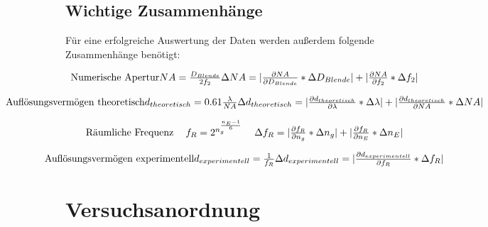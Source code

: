 \documentclass[12pt,a4paper,twoside]{article}
\begin{document}
\subsection{Wichtige Zusammenhänge}

Für eine erfolgreiche Auswertung der Daten werden außerdem folgende Zusammenhänge benötigt:

\begin{equation}
    \label{eq:WZ-NA}
    \centerline{Numerische Apertur \\ $NA = \frac{D_{Blende}}{2f_{2}}$ \\ $\Delta NA = \vert \frac{\partial NA}{\partial D_{Blende}} * \Delta D_{Blende} \vert + \vert \frac{\partial NA}{\partial f_{2}} * \Delta f_{2} \vert $}
\end{equation}

\begin{equation}
    \label{eq:WZ-dTheo}
    \centerline{Auflösungsvermögen theoretisch \\ $d_{theoretisch} = 0.61\frac{\lambda}{NA}$ \\ $\Delta d_{theoretisch} = \vert \frac{\partial d_{theoretisch}}{\partial \lambda} * \Delta \lambda \vert + \vert \frac{\partial d_{theoretisch}}{\partial NA} * \Delta NA \vert $}
\end{equation}

\begin{equation}
    \label{eq:WZ-fr}
    \centerline{Räumliche Frequenz \\ $f_{R} = 2^{n_{g}^{\frac{n_{E}-1}{6}}}$ \\ $\Delta f_{R} = \vert \frac{\partial f_{R}}{\partial n_{g}} * \Delta n_{g} \vert + \vert \frac{\partial f_{R}}{\partial n_{E}} * \Delta n_{E} \vert $}
\end{equation}

\begin{equation}
    \label{eq:WZ-dExp}
    \centerline{Auflösungsvermögen experimentell \\ $d_{experimentell} = \frac{1}{f_{R}}$ \\ $\Delta d_{experimentell} = \vert \frac{\partial d_{experimentell}}{\partial f_{R}} * \Delta f_{R} \vert$}
\end{equation}


    

\section{Versuchsanordnung} %
\end{document}
